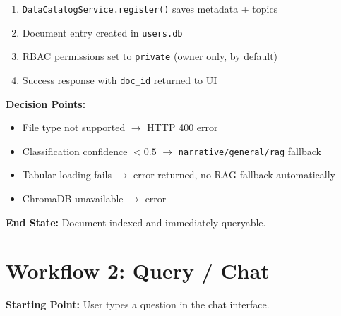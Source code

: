 \documentclass[12pt, a4paper, oneside]{report}
\newcommand{\kw}[1]{\texttt{\small #1}}
\begin{document}
\begin{enumerate}
\begin{itemize}
          \item \kw{AutoConfigService} $\to$ optimal settings
          \item \kw{TextPreprocessor} $\to$ clean text
          \item \kw{LanguageDetector} $\to$ select embedding model
          \item \kw{ChunkingOptimizer} $\to$ best strategy $\to$ chunks
          \item \kw{EmbeddingManager} vectorizes each chunk
          \item Chunks stored in ChromaDB; BM25 index updated
          \item Knowledge graph extraction (async, optional)
        \end{itemize}
  \item \kw{DataCatalogService.register()} saves metadata + topics
  \item Document entry created in \kw{users.db}
  \item RBAC permissions set to \kw{private} (owner only, by default)
  \item Success response with \kw{doc\_id} returned to UI
\end{enumerate}

\textbf{Decision Points:}
\begin{itemize}
  \item File type not supported $\to$ HTTP 400 error
  \item Classification confidence $< 0.5$ $\to$ \kw{narrative/general/rag} fallback
  \item Tabular loading fails $\to$ error returned, no RAG fallback automatically
  \item ChromaDB unavailable $\to$ error
\end{itemize}

\textbf{End State:} Document indexed and immediately queryable.

\section{Workflow 2: Query / Chat}

\textbf{Starting Point:} User types a question in the chat interface.
\end{document}
